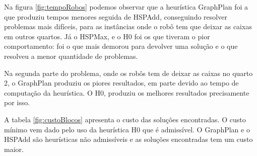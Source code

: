 

Na figura \ref{fig:tempoRobos} podemos observar que a heurística GraphPlan foi a que produziu tempos menores seguida de HSPAdd, conseguindo resolver problemas mais difíceis, para as instâncias onde o robô tem que deixar as caixas em outros quartos. Já o HSPMax, e o H0 foi os que tiveram o pior comportamento: foi o que mais demorou para devolver uma solução e o que resolveu a menor quantidade de problemas.

Na segunda parte do problema, onde os robôs tem de deixar as caixas no quarto 2, o GraphPlan produziu os piores resultados, em parte devido ao tempo de computação da heurística. O H0, produziu os melhores resultados precisamente por isso.

A tabela \ref{fig:custoBlocos} apresenta o custo das soluções encontradas.
O custo mínimo vem dado pelo uso da heurística H0 que é admissível.
O GraphPlan e o HSPAdd são heurísticas não admissíveis e as soluções encontradas tem um custo maior.